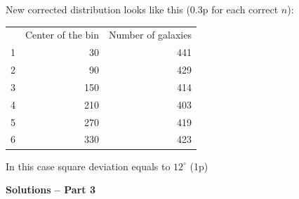 \begin{description}
  New corrected distribution looks like this (0.3p for each correct
  $n$):

  \begin{center}
  \begin{tabular}{rrr}
  & Center of the bin & Number of galaxies\\
  1 & 30 & 441\\
  2 & 90 & 429\\
  3 & 150 & 414\\
  4 & 210 & 403\\
  5 & 270 & 419\\
  6 & 330 & 423
  \end{tabular}
  \end{center}

  In this case square deviation equals to $12^\circ$ (1p)
\end{description}

\textbf{Solutions -- Part 3}

